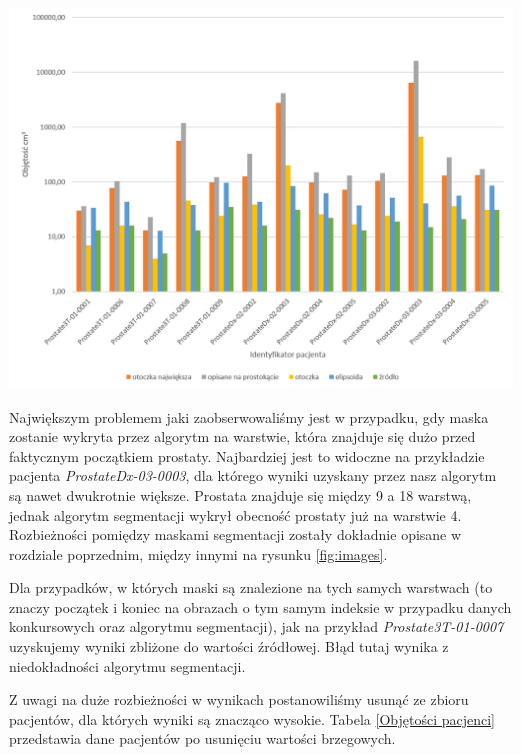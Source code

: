 \documentclass[a4paper,11pt,twoside]{report}
\theoremstyle{definition}
\begin{document}
\begin{minipage}[h]{\linewidth}
	\centering
	\includegraphics[width=\textwidth]{Pacjenci.png}
\end{minipage}

\par
Największym problemem jaki zaobserwowaliśmy jest w przypadku, gdy maska zostanie wykryta przez algorytm na warstwie, która znajduje się dużo przed faktycznym początkiem prostaty. Najbardziej jest to widoczne na przykładzie pacjenta \textit{ProstateDx-03-0003}, dla którego wyniki uzyskany przez nasz algorytm są nawet dwukrotnie większe. Prostata znajduje się między 9 a 18 warstwą, jednak algorytm segmentacji wykrył obecność prostaty już na warstwie 4. Rozbieżności pomiędzy maskami segmentacji zostały dokładnie opisane w rozdziale poprzednim, między innymi na rysunku \ref{fig:images}. 
\par 
Dla przypadków, w których maski są znalezione na tych samych warstwach (to znaczy początek i koniec na obrazach o tym samym indeksie w przypadku danych konkursowych oraz algorytmu segmentacji), jak na przykład \textit{Prostate3T-01-0007} uzyskujemy wyniki zbliżone do wartości źródłowej. Błąd tutaj wynika z niedokładności algorytmu segmentacji.

Z uwagi na duże rozbieżności w wynikach postanowiliśmy usunąć ze zbioru pacjentów, dla których wyniki są znacząco wysokie. Tabela \ref{Objętości pacjenci} przedstawia dane pacjentów po usunięciu wartości brzegowych.
\end{document}
